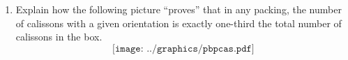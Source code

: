 \begin{problems}
\begin{enumerate}
\item Explain how the following picture ``proves'' that  in any packing, the number of calissons with a given orientation is exactly one-third the total number of calissons in the box.
\[
\texttt{[image: ../graphics/pbpcas.pdf]}
\]
\end{enumerate}
\end{problems}
